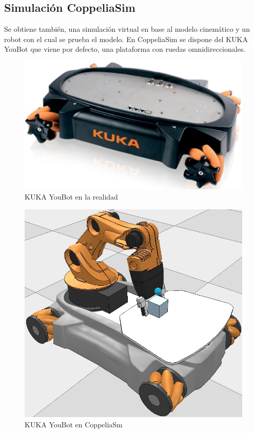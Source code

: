 \documentclass[conference]{IEEEtran}
\begin{document}
  \subsection{Simulación CoppeliaSim}
  Se obtiene también, una simulación virtual en base al modelo cinemático y un robot con el cual se prueba el modelo.
  En CoppeliaSim se dispone del KUKA YouBot que viene por defecto, una plataforma con ruedas omnidireccionales.
  
  \begin{figure}
    \includegraphics[width=\linewidth]{figures/kuka_real_youbot.jpg}
    \caption{KUKA YouBot en la realidad}
    \label{fig:kukayoubot}
  \end{figure}

  \begin{figure}
    \includegraphics[width=\linewidth]{figures/kuka_sim_youbot.jpg}
    \caption{KUKA YouBot en CoppeliaSm}
    \label{fig:kukayoubot}
  \end{figure}
  
\end{document}
